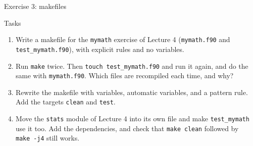 \begin{frame}{Exercise 3: makefiles}
  \begin{block}{Tasks}
    \begin{enumerate}
      \item Write a makefile for the \texttt{mymath} exercise of Lecture 4 (\texttt{mymath.f90} and \texttt{test\_mymath.f90}), with explicit rules and no variables.
      \item Run \texttt{make} twice. Then \texttt{touch test\_mymath.f90} and run it again, and do the same with \texttt{mymath.f90}. Which files are recompiled each time, and why?
      \item Rewrite the makefile with variables, automatic variables, and a pattern rule. Add the targets \texttt{clean} and \texttt{test}.
      \item Move the \texttt{stats} module of Lecture 4 into its own file and make \texttt{test\_mymath} use it too. Add the dependencies, and check that \texttt{make clean} followed by \texttt{make -j4} still works.
    \end{enumerate}
  \end{block}
\end{frame}



